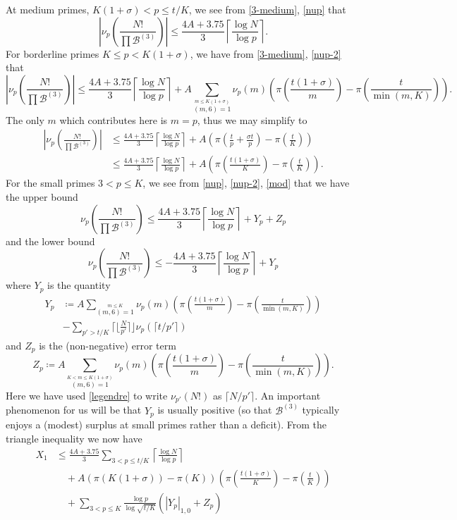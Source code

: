 \documentclass[12pt,a4paper,reqno]{amsart}
\numberwithin{equation}{section}
\theoremstyle{plain}
\theoremstyle{definition}
\newcommand\tuple{{\mathcal B}}
\begin{document}
At medium primes, $K(1+\sigma) < p \leq t/K$, we see from \eqref{3-medium}, \eqref{nup} that
$$
   \left|\nu_p\left(\frac{N!}{\prod \tuple^{(3)}}\right)\right| \leq \frac{4A+3.75}{3} \left\lceil \frac{\log N}{\log p} \right\rceil.$$
For borderline primes $K \leq p < K(1+\sigma)$, we have from \eqref{3-medium}, \eqref{nup-2} that
$$
\left|\nu_p\left(\frac{N!}{\prod \tuple^{(3)}}\right)\right| \leq \frac{4A+3.75}{3} \left\lceil \frac{\log N}{\log p} \right\rceil + A \sum_{\stackrel{m \leq K(1+\sigma)}{(m,6)=1}} \nu_p(m) \left(\pi\left(\frac{t(1+\sigma)}{m}\right)
- \pi\left(\frac{t}{\min(m,K)}\right) \right).$$
The only $m$ which contributes here is $m=p$, thus we may simplify to
\begin{align*}
\left|\nu_p\left(\frac{N!}{\prod \tuple^{(3)}}\right)\right| &\leq \frac{4A+3.75}{3} \left\lceil \frac{\log N}{\log p} \right\rceil + A \left(\pi\left(\frac{t}{p}+\frac{\sigma t}{p}\right)
- \pi\left(\frac{t}{K}\right) \right) \\
&\leq \frac{4A+3.75}{3} \left\lceil \frac{\log N}{\log p} \right\rceil + A \left(\pi\left(\frac{t(1+\sigma)}{K}\right)
- \pi\left(\frac{t}{K}\right) \right).
\end{align*}
For the small primes $3 < p \leq K$, we see from \eqref{nup}, \eqref{nup-2}, \eqref{mod} that we have the upper bound
$$ \nu_p\left(\frac{N!}{\prod \tuple^{(3)}}\right) \leq
\frac{4A+3.75}{3} \left\lceil \frac{\log N}{\log p} \right\rceil + Y_p + Z_p $$
and the lower bound
$$ \nu_p\left(\frac{N!}{\prod \tuple^{(3)}}\right) \leq
- \frac{4A+3.75}{3} \left\lceil \frac{\log N}{\log p} \right\rceil + Y_p$$
where $Y_p$ is the quantity
\begin{align*} Y_p &\coloneqq
A \sum_{\stackrel{m \leq K}{(m,6)=1}} \nu_p(m) \left(\pi\left(\frac{t(1+\sigma)}{m}\right)
- \pi\left(\frac{t}{\min(m,K)}\right) \right) \\
&- \sum_{p' > t/K} \lceil\lfloor \frac{N}{p'} \rceil\rfloor\nu_{p}(\lceil t/p' \rceil)
\end{align*}
and $Z_p$ is the (non-negative) error term
$$ Z_p \coloneqq
  A \sum_{\stackrel{K < m \leq K(1+\sigma)}{(m,6)=1}} \nu_p(m) \left(\pi\left(\frac{t(1+\sigma)}{m}\right)
  - \pi\left(\frac{t}{\min(m,K)}\right) \right).
$$
Here we have used \eqref{legendre} to write $\nu_{p'}(N!)$ as $\lceil N/p' \rceil$.  An important phenomenon for us will be that $Y_p$ is usually positive (so that $\tuple^{(3)}$ typically enjoys a (modest) surplus at small primes rather than a deficit).  From the triangle inequality we now have
\begin{equation}\label{x1-upper}
\begin{split}
  X_1 &\leq \frac{4A+3.75}{3} \sum_{3 < p \leq t/K}  \left\lceil \frac{\log N}{\log p} \right\rceil \\
  &\quad + A \left( \pi(K(1+\sigma))-\pi(K)\right) \left(\pi\left(\frac{t(1+\sigma)}{K}\right)
  - \pi\left(\frac{t}{K}\right) \right)\\
  &\quad +
\sum_{3 < p \leq K} \frac{\log p}{\log \sqrt{t/K}} (|Y_p|_{1,0} + Z_p)
\end{split}
\end{equation}
\end{document}
